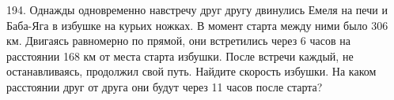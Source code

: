 194. Однажды одновременно навстречу друг другу двинулись Емеля на печи и Баба-Яга в избушке на курьих ножках. В момент старта между ними было 306 км. Двигаясь равномерно по прямой, они встретились через 6 часов на расстоянии 168 км от места старта избушки. После встречи каждый, не останавливаясь, продолжил свой путь. Найдите скорость избушки. На каком расстоянии друг от друга они будут через 11 часов после старта?\\

